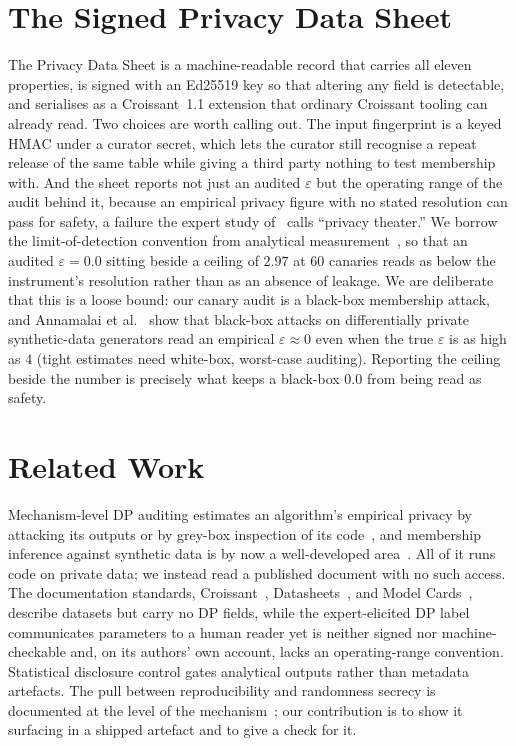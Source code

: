 \documentclass[conference]{IEEEtran}
\newcommand{\eps}{\varepsilon}
\begin{document}
\section{The Signed Privacy Data Sheet}
The Privacy Data Sheet is a machine-readable record that carries all eleven properties, is signed with
an Ed25519 key so that altering any field is detectable, and serialises as a Croissant~1.1 extension
that ordinary Croissant tooling can already read. Two choices are worth calling out. The input
fingerprint is a keyed HMAC under a curator secret, which lets the curator still recognise a repeat
release of the same table while giving a third party nothing to test membership with. And the sheet
reports not just an audited $\eps$ but the operating range of the audit behind it, because an empirical
privacy figure with no stated resolution can pass for safety, a failure the expert study
of~\cite{dibia2026} calls ``privacy theater.'' We borrow the limit-of-detection convention from
analytical measurement~\cite{miqe2025}, so that an audited $\eps=0.0$ sitting beside a ceiling of
$2.97$ at $60$ canaries reads as below the instrument's resolution rather than as an absence of
leakage. We are deliberate that this is a loose bound: our canary audit is a black-box membership
attack, and Annamalai et al.~\cite{annamalai2024} show that black-box attacks on differentially
private synthetic-data generators read an empirical $\eps\approx0$ even when the true $\eps$ is as high
as $4$ (tight estimates need white-box, worst-case auditing). Reporting the ceiling beside the number
is precisely what keeps a black-box $0.0$ from being read as safety.

\section{Related Work}
Mechanism-level DP auditing estimates an algorithm's empirical privacy by attacking its outputs or by
grey-box inspection of its code~\cite{annamalai2024,cebere2026}, and membership inference against
synthetic data is by now a well-developed area~\cite{stadler2022}. All of it runs code on private
data; we instead read a published document with no such access. The documentation standards,
Croissant~\cite{croissant}, Datasheets~\cite{gebru2021}, and Model Cards~\cite{mitchell2019}, describe
datasets but carry no DP fields, while the expert-elicited DP label~\cite{dibia2026} communicates
parameters to a human reader yet is neither signed nor machine-checkable and, on its authors' own
account, lacks an operating-range convention. Statistical disclosure control gates analytical outputs
rather than metadata artefacts. The pull between reproducibility and randomness secrecy is documented
at the level of the mechanism~\cite{garfinkel2020,mironov2012}; our contribution is to show it
surfacing in a shipped artefact and to give a check for it.
\end{document}
